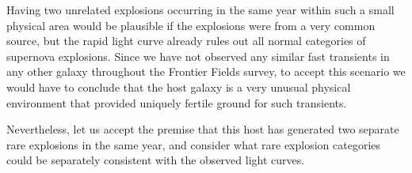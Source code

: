Having two unrelated explosions occurring in the same
year within such a small physical area would be plausible if the
explosions were from a very common source, but the rapid light curve
already rules out all normal categories of supernova explosions.
Since we have not observed any similar fast transients in any other
galaxy throughout the Frontier Fields survey, to accept this scenario
we would have to conclude that the \spock host galaxy is a very
unusual physical environment that provided uniquely fertile ground for
such transients.


Nevertheless, let us accept the premise that this host has generated
two separate rare explosions in the same year, and consider what rare
explosion categories could be separately consistent with the observed
light curves.



